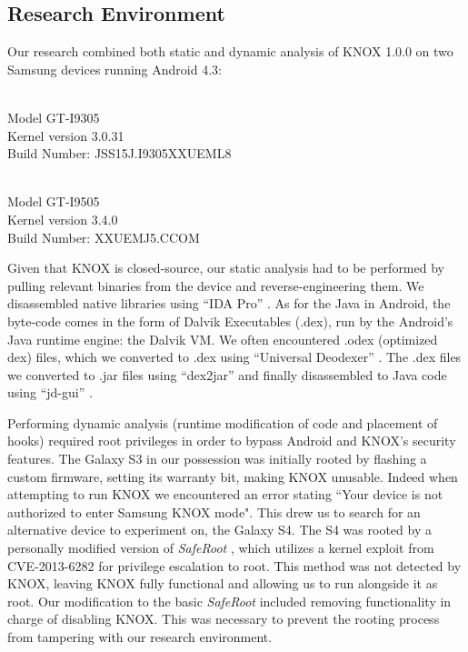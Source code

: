 \documentclass[11pt]{article}
\begin{document}
\subsection{Research Environment}
Our research combined both static and dynamic analysis of KNOX 1.0.0 on two Samsung devices running
Android 4.3:
\begin{description} \setlength{\itemsep}{0pt}
  \item [Galaxy S3] \hfill \\ Model GT-I9305 \\ Kernel version 3.0.31 \\ Build Number: JSS15J.I9305XXUEML8
  \item [Galaxy S4] \hfill \\ Model GT-I9505 \\ Kernel version 3.4.0 \\ Build Number: XXUEMJ5.CCOM
\end{description}

Given that KNOX is closed-source, our static analysis had to be performed by pulling relevant binaries from the device 
and reverse-engineering them. We disassembled native libraries using ``IDA Pro'' \cite{IDAPro}. 
As for the Java in Android, the byte-code comes in the form of Dalvik Executables (.dex), run by the Android's Java runtime engine: the Dalvik VM.
We often encountered .odex (optimized dex) files, which we converted to .dex using ``Universal Deodexer'' \cite{UniversalDeodexer}. 
The .dex files we converted to .jar files using ``dex2jar'' \cite{dex2jar} and finally disassembled to Java code using ``jd-gui'' \cite{JDGui}.

Performing dynamic analysis (runtime modification of code and placement of hooks) required root privileges in order to bypass Android and 
KNOX's security features.
The Galaxy S3 in our possession was initially rooted by flashing a custom firmware, setting its warranty bit, making KNOX unusable.
Indeed when attempting to run KNOX we encountered an error stating ``Your device is not authorized to enter Samsung KNOX mode". 
This drew us to search for an alternative device to experiment on, the Galaxy S4. The S4 was rooted by a personally modified version of \emph{SafeRoot} 
\cite{SafeRoot}, which utilizes a kernel exploit from CVE-2013-6282 \cite{CVE-2013-6282} for privilege escalation to root. 
This method was not detected by KNOX, leaving KNOX fully functional and allowing us to run alongside it as root. Our modification to the basic \emph{SafeRoot} 
included removing functionality in charge of disabling KNOX. This was necessary to prevent the rooting process from tampering with our research environment. 
\end{document}
